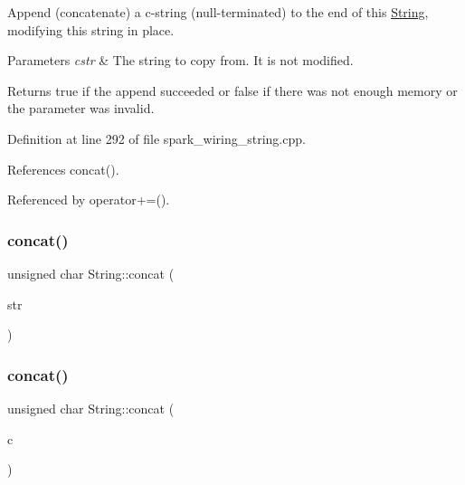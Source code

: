 Append (concatenate) a c-\/string (null-\/terminated) to the end of this \hyperlink{class_string}{String}, modifying this string in place. 


\begin{DoxyParams}{Parameters}
{\em cstr} & The string to copy from. It is not modified.\\
\hline
\end{DoxyParams}
\begin{DoxyReturn}{Returns}
true if the append succeeded or false if there was not enough memory or the parameter was invalid. 
\end{DoxyReturn}


Definition at line 292 of file spark\+\_\+wiring\+\_\+string.\+cpp.



References concat().



Referenced by operator+=().

\mbox{\label{class_string_a09dd174078f7d0b1552b249949cfd96c}} 
\subsubsection{\texorpdfstring{concat()}{concat()}\hspace{0.1cm}{\footnotesize\ttfamily [3/12]}}
{\footnotesize\ttfamily unsigned char String\+::concat (\begin{DoxyParamCaption}\item[{const \+\_\+\+\_\+\+Flash\+String\+Helper $\ast$}]{str }\end{DoxyParamCaption})}

\mbox{\label{class_string_a5f3e286a1a7b65a154e3e3dd19d4b707}} 
\subsubsection{\texorpdfstring{concat()}{concat()}\hspace{0.1cm}{\footnotesize\ttfamily [4/12]}}
{\footnotesize\ttfamily unsigned char String\+::concat (\begin{DoxyParamCaption}\item[{char}]{c }\end{DoxyParamCaption})}



